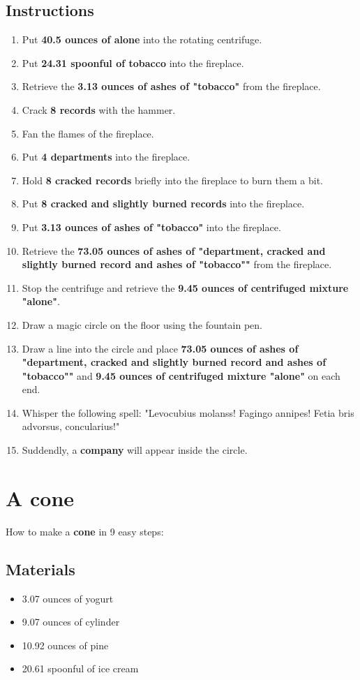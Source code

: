 \documentclass{article}
\begin{document}
\subsection{Instructions}\begin{enumerate}
\item 
Put \textbf{40.5 ounces of alone} into the rotating centrifuge.
\item 
Put \textbf{24.31 spoonful of tobacco} into the fireplace.
\item 
Retrieve the \textbf{3.13 ounces of ashes of "tobacco"} from the fireplace.
\item 
Crack \textbf{8 records} with the hammer.
\item 
Fan the flames of the fireplace.
\item 
Put \textbf{4 departments} into the fireplace.
\item 
Hold \textbf{8 cracked records} briefly into the fireplace to burn them a bit.
\item 
Put \textbf{8 cracked and slightly burned records} into the fireplace.
\item 
Put \textbf{3.13 ounces of ashes of "tobacco"} into the fireplace.
\item 
Retrieve the \textbf{73.05 ounces of ashes of "department, cracked and slightly burned record and ashes of "tobacco""} from the fireplace.
\item 
Stop the centrifuge and retrieve the \textbf{9.45 ounces of centrifuged mixture "alone"}.
\item 
Draw a magic circle on the floor using the fountain pen.
\item 
Draw a line into the circle and place \textbf{73.05 ounces of ashes of "department, cracked and slightly burned record and ashes of "tobacco""} and \textbf{9.45 ounces of centrifuged mixture "alone"} on each end.
\item 
Whisper the following spell: "Levocubius molanss! Fagingo annipes! Fetia bris advorsus, concularius!"
\item 
Suddendly, a \textbf{company} will appear inside the circle.
\end{enumerate}
\newpage
\section{A cone}How to make a \textbf{cone} in 9 easy steps:

\subsection{Materials}\begin{itemize}
\item 
3.07 ounces of yogurt
\item 
9.07 ounces of cylinder
\item 
10.92 ounces of pine
\item 
20.61 spoonful of ice cream
\end{itemize}
\end{document}
